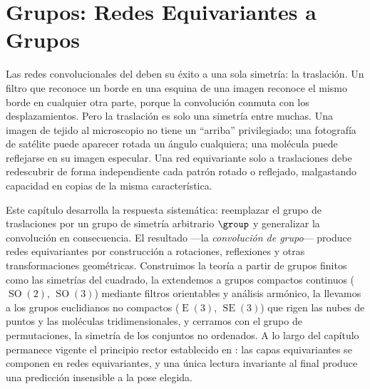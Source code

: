 \providecommand{\SO}{\operatorname{SO}}
\providecommand{\OO}{\operatorname{O}}
\providecommand{\SE}{\operatorname{SE}}
\providecommand{\Eucl}{\operatorname{E}}
\providecommand{\GL}{\operatorname{GL}}
\providecommand{\Sym}{\mathfrak{S}}
\providecommand{\Haar}{\mathrm{d}\mu}
\providecommand{\softmax}{\operatorname{softmax}}
\providecommand{\Stab}{\operatorname{Stab}}
\providecommand{\Orb}{\operatorname{Orb}}
\providecommand{\Attn}{\operatorname{Attn}}
\providecommand{\MLP}{\operatorname{MLP}}
\providecommand{\diag}{\operatorname{diag}}

\chapter{Grupos: Redes Equivariantes a Grupos}
\label{ch:groups}

Las redes convolucionales del  deben su \'exito a una sola
simetr\'ia: la traslaci\'on. Un filtro que reconoce un borde en una esquina de
una imagen reconoce el mismo borde en cualquier otra parte, porque la
convoluci\'on conmuta con los desplazamientos. Pero la traslaci\'on es solo una
simetr\'ia entre muchas. Una imagen de tejido al microscopio no tiene un
``arriba'' privilegiado; una fotograf\'ia de sat\'elite puede aparecer rotada un
\'angulo cualquiera; una mol\'ecula puede reflejarse en su imagen especular. Una
red equivariante solo a traslaciones debe redescubrir de forma independiente cada
patr\'on rotado o reflejado, malgastando capacidad en copias de la misma
caracter\'istica.

Este cap\'itulo desarrolla la respuesta sistem\'atica: reemplazar el grupo de
traslaciones por un grupo de simetr\'ia arbitrario $\group$ y generalizar la
convoluci\'on en consecuencia. El resultado ---la \emph{convoluci\'on de grupo}---
produce redes equivariantes por construcci\'on a rotaciones, reflexiones y otras
transformaciones geom\'etricas. Construimos la teor\'ia a partir de grupos finitos
como las simetr\'ias del cuadrado, la extendemos a grupos compactos continuos
($\SO(2)$, $\SO(3)$) mediante filtros orientables y an\'alisis arm\'onico, la
llevamos a los grupos euclidianos no compactos ($\Eucl(3)$, $\SE(3)$) que rigen
las nubes de puntos y las mol\'eculas tridimensionales, y cerramos con el grupo de
permutaciones, la simetr\'ia de los conjuntos no ordenados. A lo largo del
cap\'itulo permanece vigente el principio rector establecido en
: las capas equivariantes se componen en redes equivariantes, y
una \'unica lectura invariante al final produce una predicci\'on insensible a la
pose elegida.

